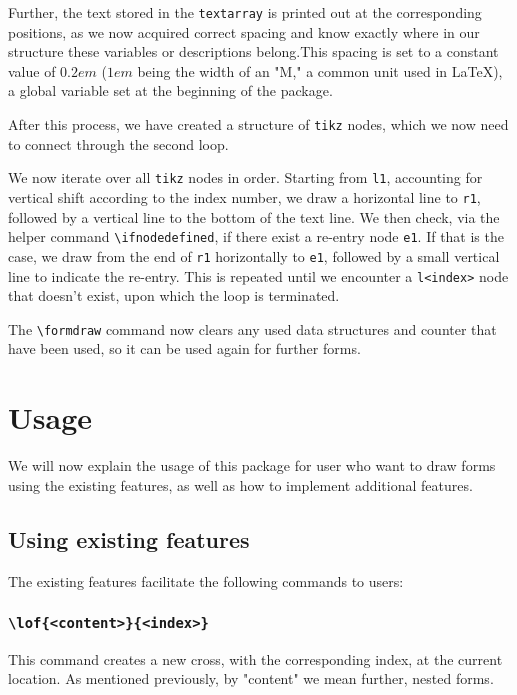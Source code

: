 \documentclass[12pt]{article}
\begin{document}
Further, the text stored in the \texttt{textarray} is printed out at the corresponding positions, as we now acquired correct spacing and know exactly where in our structure these variables or descriptions belong.This spacing is set to a constant value of $0.2em$ ($1em$ being the width of an "M," a common unit used in \LaTeX), a global variable set at the beginning of the package.

After this process, we have created a structure of \texttt{tikz}\cite{tikz} nodes, which we now need to connect through the second loop.

We now iterate over all \texttt{tikz}\cite{tikz} nodes in order. Starting from \texttt{l1}, accounting for vertical shift according to the index number, we draw a horizontal line to \texttt{r1}, followed by a vertical line to the bottom of the text line. We then check, via the helper command \texttt{\textbackslash ifnodedefined}, if there exist a re-entry node \texttt{e1}. If that is the case, we draw from the end of \texttt{r1} horizontally to \texttt{e1}, followed by a small vertical line to indicate the re-entry.
This is repeated until we encounter a \texttt{l<index>} node that doesn't exist, upon which the loop is terminated.

The \texttt{\textbackslash formdraw} command now clears any used data structures and counter that have been used, so it can be used again for further forms.

\section{Usage}

We will now explain the usage of this package for user who want to draw forms using the existing features, as well as how to implement additional features.

\subsection{Using existing features}

The existing features facilitate the following commands to users:

\subsubsection*{\texttt{\textbackslash lof\{<content>\}\{<index>\}}}

This command creates a new cross, with the corresponding index, at the current location. As mentioned previously, by "content" we mean further, nested forms.
\end{document}
